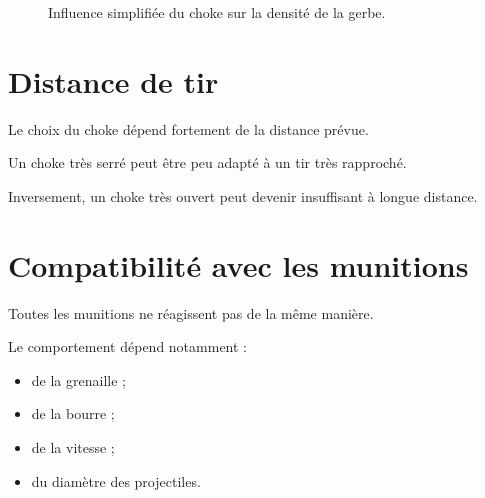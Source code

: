 \begin{figure}[htbp]
\centering


\caption{Influence simplifiée du choke sur la densité de la gerbe.}
\label{fig:gerbe_choke}

\end{figure}

\section{Distance de tir}

Le choix du choke dépend fortement de la distance prévue.

Un choke très serré peut être peu adapté à un tir très rapproché.

Inversement, un choke très ouvert peut devenir insuffisant à longue distance.

\section{Compatibilité avec les munitions}

Toutes les munitions ne réagissent pas de la même manière.

Le comportement dépend notamment :

\begin{itemize}
    \item de la grenaille ;
    \item de la bourre ;
    \item de la vitesse ;
    \item du diamètre des projectiles.
\end{itemize}

